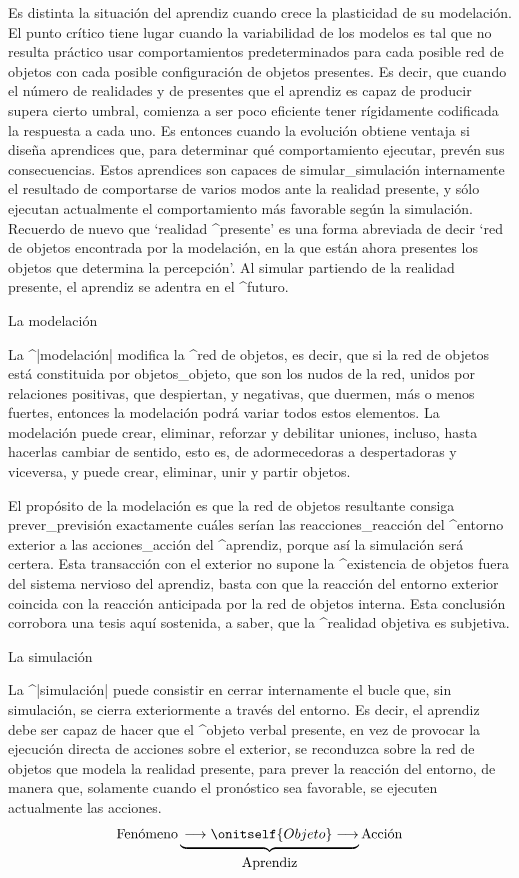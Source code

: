 Es distinta la situación del aprendiz cuando crece la plasticidad de su
modelación. El punto crítico tiene lugar cuando la variabilidad de los
modelos es tal que no resulta práctico usar comportamientos
predeterminados para cada posible red de objetos con cada posible
configuración de objetos presentes. Es decir, que cuando el número de
realidades y de presentes que el aprendiz es capaz de producir supera
cierto umbral, comienza a ser poco eficiente tener rígidamente
codificada la respuesta a cada uno. Es entonces cuando la evolución
obtiene ventaja si diseña aprendices que, para determinar qué
comportamiento ejecutar, prevén sus consecuencias. Estos aprendices son
capaces de simular_{simulación} internamente el resultado de comportarse
de varios modos ante la realidad presente, y sólo ejecutan actualmente
el comportamiento más favorable según la simulación. Recuerdo de nuevo
que `realidad ^{presente}' es una forma abreviada de decir `red de
objetos encontrada por la modelación, en la que están ahora presentes
los objetos que determina la percepción'. Al simular partiendo de la
realidad presente, el aprendiz se adentra en el ^{futuro}.


\Section La modelación

La ^|modelación| modifica la ^{red de objetos}, es decir, que si la red
de objetos está constituida por objetos_{objeto}, que son los nudos de
la red, unidos por relaciones positivas, que despiertan, y negativas,
que duermen, más o menos fuertes, entonces la modelación podrá variar
todos estos elementos. La modelación puede crear, eliminar, reforzar y
debilitar uniones, incluso, hasta hacerlas cambiar de sentido, esto es,
de adormecedoras a despertadoras y viceversa, y puede crear, eliminar,
unir y partir objetos.

El propósito de la modelación es que la red de objetos resultante
consiga prever_{previsión} exactamente cuáles serían las
reacciones_{reacción} del ^{entorno} exterior a las acciones_{acción}
del ^{aprendiz}, porque así la simulación será certera. Esta transacción
con el exterior no supone la ^{existencia} de objetos fuera del sistema
nervioso del aprendiz, basta con que la reacción del entorno exterior
coincida con la reacción anticipada por la red de objetos interna. Esta
conclusión corrobora una tesis aquí sostenida, a saber, que la
^{realidad} objetiva es subjetiva.


\Section La simulación

La ^|simulación| puede consistir en cerrar internamente el bucle que,
sin simulación, se cierra exteriormente a través del entorno. Es decir,
el aprendiz debe ser capaz de hacer que el ^{objeto verbal} presente, en
vez de provocar la ejecución directa de acciones sobre el exterior, se
reconduzca sobre la red de objetos que modela la realidad presente, para
prever la reacción del entorno, de manera que, solamente cuando el
pronóstico sea favorable, se ejecuten actualmente las acciones.
$$\hbox{Fenómeno}
   \underbrace{\strut
    \longrightarrow
    \onitself{\strut Objeto}
    \longrightarrow}_{\hbox{\strut Aprendiz}}
  \hbox{Acción}
$$

